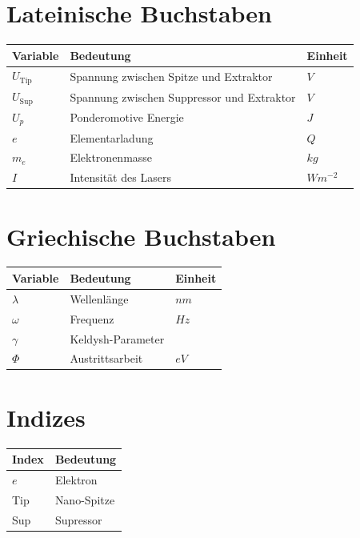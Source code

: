 \documentclass[bachelor,       %
               twoside,        %
               BCOR10mm,       %
               english,ngerman, %
               ]{GAUBM}
\newcommand{\tabheadfont}[1]{\textbf{#1}} %
\begin{document}
\cleardoublepage
\onehalfspacing
\tableofcontents

\begin{nomenclature}
\section*{Lateinische Buchstaben}
\noindent
\begin{longtable}[l]{p{}p{}p{}}
  \tabheadfont{Variable}&\tabheadfont{Bedeutung}&\tabheadfont{Einheit}\\\midrule\endhead
  $U_\text{Tip}$ & Spannung zwischen Spitze und Extraktor & $\unit{V}$\\
  $U_\text{Sup}$ & Spannung zwischen Suppressor und Extraktor & $\unit{V}$\\
  $U_p$ & Ponderomotive Energie & $\unit{J}$\\
  $e$ & Elementarladung & $\unit{Q}$\\
  $m_e$ & Elektronenmasse & $\unit{kg}$\\
  $I$ & Intensität des Lasers & $\unit{Wm^{-2}}$
\end{longtable}
\section*{Griechische Buchstaben}
\begin{longtable}[l]{p{}p{}p{}}
  \tabheadfont{Variable}&\tabheadfont{Bedeutung}&\tabheadfont{Einheit}\\\midrule\endhead
  $\lambda$ & Wellenlänge & $\unit{nm}$\\
  $\omega$ & Frequenz & $\unit{Hz}$\\
  $\gamma$  & Keldysh-Parameter & $\unit{}$\\
  $\Phi$ & Austrittsarbeit & $\unit{eV}$
\end{longtable}
\section*{Indizes}
\begin{longtable}[l]{p{}p{}}
  \tabheadfont{Index}&\tabheadfont{Bedeutung}\\\midrule\endhead
  $e$ & Elektron\\
  Tip & Nano-Spitze\\
  Sup & Supressor
\end{longtable}

\end{nomenclature}
\end{document}
